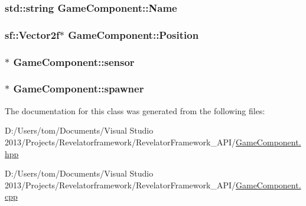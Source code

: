 \hypertarget{class_game_component_ab1037207fec65ac5fe65dec1e22f0566}{
\subsubsection[{Name}]{\setlength{\rightskip}{0pt plus 5cm}std\-::string Game\-Component\-::\-Name\hspace{0.3cm}{\ttfamily [protected]}}}\label{class_game_component_ab1037207fec65ac5fe65dec1e22f0566}
\hypertarget{class_game_component_acc3109bb4ae36112eb8796e067160c59}{
\subsubsection[{Position}]{\setlength{\rightskip}{0pt plus 5cm}sf\-::\-Vector2f$\ast$ Game\-Component\-::\-Position\hspace{0.3cm}{\ttfamily [protected]}}}\label{class_game_component_acc3109bb4ae36112eb8796e067160c59}
\hypertarget{class_game_component_ad585bf57df228afc83fbf777142e51bd}{
\subsubsection[{sensor}]{$\ast$ Game\-Component\-::sensor\hspace{0.3cm}{\ttfamily [protected]}}}\label{class_game_component_ad585bf57df228afc83fbf777142e51bd}
\hypertarget{class_game_component_a15caaab21ec2e8eb9d438a25afbef4da}{
\subsubsection[{spawner}]{$\ast$ Game\-Component\-::spawner\hspace{0.3cm}{\ttfamily [protected]}}}\label{class_game_component_a15caaab21ec2e8eb9d438a25afbef4da}


The documentation for this class was generated from the following files\-:\begin{DoxyCompactItemize}
\item 
D\-:/\-Users/tom/\-Documents/\-Visual Studio 2013/\-Projects/\-Revelatorframework/\-Revelator\-Framework\-\_\-\-A\-P\-I/\hyperlink{_game_component_8hpp}{Game\-Component.\-hpp}\item 
D\-:/\-Users/tom/\-Documents/\-Visual Studio 2013/\-Projects/\-Revelatorframework/\-Revelator\-Framework\-\_\-\-A\-P\-I/\hyperlink{_game_component_8cpp}{Game\-Component.\-cpp}\end{DoxyCompactItemize}
